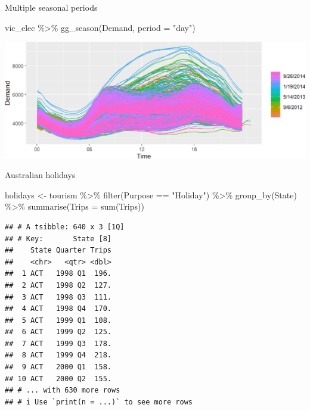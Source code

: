 \documentclass[14pt,ignorenonframetext,aspectratio=169]{beamer}
\newenvironment{Shaded}{\begin{snugshade}}{\end{snugshade}}
\newcommand{\AttributeTok}[1]{\textcolor[rgb]{0.77,0.63,0.00}{#1}}
\newcommand{\FunctionTok}[1]{\textcolor[rgb]{0.00,0.00,0.00}{#1}}
\newcommand{\NormalTok}[1]{#1}
\newcommand{\OtherTok}[1]{\textcolor[rgb]{0.56,0.35,0.01}{#1}}
\newcommand{\SpecialCharTok}[1]{\textcolor[rgb]{0.00,0.00,0.00}{#1}}
\newcommand{\StringTok}[1]{\textcolor[rgb]{0.31,0.60,0.02}{#1}}
\renewenvironment{Shaded}{\color{black}\begin{snugshade}\color{black}}{\end{snugshade}}
\renewenvironment{Shaded}{\color{black}\fontsize{10}{10}\sf\begin{snugshade}\color{black}}{\end{snugshade}}
\begin{document}
\begin{frame}[fragile]{Multiple seasonal periods}
\protect\hypertarget{multiple-seasonal-periods-3}{}
\fontsize{9}{9}\sf

\begin{Shaded}
\begin{Highlighting}[]
\NormalTok{vic\_elec }\SpecialCharTok{\%\textgreater{}\%} \FunctionTok{gg\_season}\NormalTok{(Demand, }\AttributeTok{period =} \StringTok{"day"}\NormalTok{)}
\end{Highlighting}
\end{Shaded}

\includegraphics{2-tsgraphics_files/figure-beamer/unnamed-chunk-20-1.png}
\end{frame}

\begin{frame}[fragile]{Australian holidays}
\protect\hypertarget{australian-holidays}{}
\fontsize{9}{10}\sf

\begin{Shaded}
\begin{Highlighting}[]
\NormalTok{holidays }\OtherTok{\textless{}{-}}\NormalTok{ tourism }\SpecialCharTok{\%\textgreater{}\%}
  \FunctionTok{filter}\NormalTok{(Purpose }\SpecialCharTok{==} \StringTok{"Holiday"}\NormalTok{) }\SpecialCharTok{\%\textgreater{}\%}
  \FunctionTok{group\_by}\NormalTok{(State) }\SpecialCharTok{\%\textgreater{}\%}
  \FunctionTok{summarise}\NormalTok{(}\AttributeTok{Trips =} \FunctionTok{sum}\NormalTok{(Trips))}
\end{Highlighting}
\end{Shaded}

\begin{verbatim}
## # A tsibble: 640 x 3 [1Q]
## # Key:       State [8]
##    State Quarter Trips
##    <chr>   <qtr> <dbl>
##  1 ACT   1998 Q1  196.
##  2 ACT   1998 Q2  127.
##  3 ACT   1998 Q3  111.
##  4 ACT   1998 Q4  170.
##  5 ACT   1999 Q1  108.
##  6 ACT   1999 Q2  125.
##  7 ACT   1999 Q3  178.
##  8 ACT   1999 Q4  218.
##  9 ACT   2000 Q1  158.
## 10 ACT   2000 Q2  155.
## # ... with 630 more rows
## # i Use `print(n = ...)` to see more rows
\end{verbatim}
\end{frame}
\end{document}
